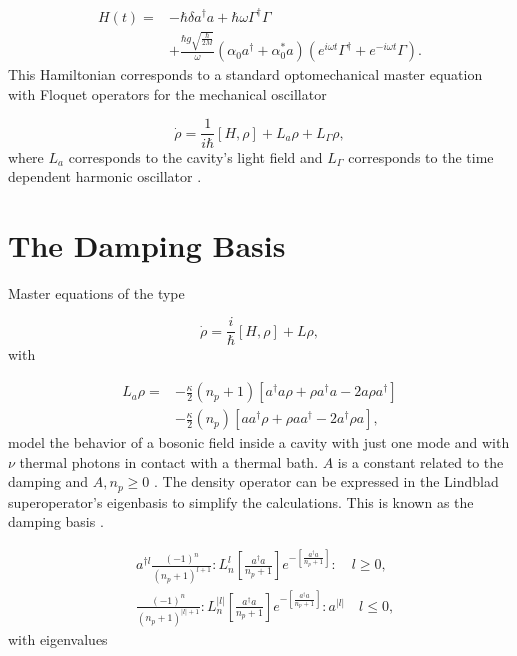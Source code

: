 \documentclass[reprint, amsmath,amssymb, aps,pra]{revtex4-1}
\begin{document}
\begin{align} \label{LCHamiltonian}
H(t) =& -\hbar \delta a^{\dagger}a +\hbar\omega\Gamma^{\dagger}\Gamma \\
&+\frac{\hbar g\sqrt{\frac{\hbar}{2M}}}{\omega}(\alpha_0 a^{\dagger}+\alpha^*_0 a)(e^{i\omega t} \nonumber\Gamma^{\dagger}+e^{-i\omega t}\Gamma).
\end{align}
This Hamiltonian corresponds to a standard optomechanical master
equation with Floquet operators for the mechanical oscillator


\begin{equation}\label{LCMasterEq}
\dot{\rho} = \frac{1}{i\hbar}[H,\rho] +L_a\rho + L_\Gamma \rho,
\end{equation} where $L_a$ corresponds to the cavity's light field \cite{ZollerQN} and $L_\Gamma$ corresponds to the time dependent harmonic oscillator \cite{HanngiFM}.



\section{The Damping Basis}\label{App1}

Master equations of the type 

\begin{equation}
\dot{\rho} = \frac{i}{\hbar}[H,\rho]+L\rho, 
\end{equation} with

\begin{align}\label{EMField}
L_a \rho =& - \frac{\kappa}{2}(n_p+1)[a^\dagger a\rho + \rho a^\dagger a -2a\rho a^\dagger] \nonumber \\
 &- \frac{\kappa}{2}(n_p)[ aa^\dagger\rho + \rho  aa^\dagger -2a^\dagger\rho a],
\end{align} model the behavior of a bosonic field inside a cavity with just one mode and with $\nu$ thermal photons in contact with a thermal bath. $A$ is a constant related to the damping and $A,n_p \geq 0$  \cite{EnglertDB}. The density operator can be expressed in the Lindblad superoperator's eigenbasis to simplify the calculations. This is known as the damping basis \cite{EnglertDB}.

\begin{align}\label{DefDB}
&a^{\dagger l}\frac{(-1)^n}{(n_p+1)^{l+1}}:L_n^l[\frac{a^\dagger a}{n_p+1}]e^{-[\frac{a^\dagger a}{n_p+1}]}:\quad l \geq 0, \\
&\frac{(-1)^n}{(n_p+1)^{|l|+1}}:L_n^{|l|}[\frac{a^\dagger a}{n_p+1}]e^{-[\frac{a^\dagger a}{n_p+1}]}:a^{|l|}\quad l \leq 0,
\end{align} with eigenvalues
\end{document}
